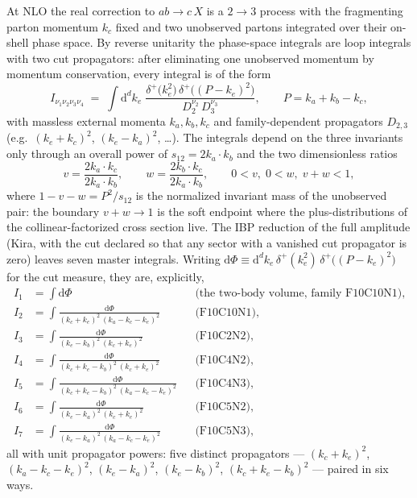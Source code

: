\documentclass[11pt]{article}
\newcommand{\dd}{\mathrm{d}}
\begin{document}
At NLO the real correction to $ab \to c\,X$ is a $2\to3$ process with
the fragmenting parton momentum $k_c$ fixed and two unobserved
partons integrated over their on-shell phase space.  By reverse
unitarity the phase-space integrals are loop integrals with two cut
propagators: after eliminating one unobserved momentum by momentum
conservation, every integral is of the form
\begin{equation}
  I_{\nu_1\nu_2\nu_3\nu_4}
  \;=\;
  \int \dd^d k_e\;
  \frac{\delta^{+}\!\big(k_e^2\big)\,
        \delta^{+}\!\big((P-k_e)^2\big)}
       {D_2^{\nu_2}\, D_3^{\nu_3}},
  \qquad P = k_a + k_b - k_c ,
  \label{eq:integral}
\end{equation}
with massless external momenta $k_a, k_b, k_c$ and family-dependent
propagators $D_{2,3}$ (e.g.\ $(k_e+k_c)^2$, $(k_e-k_a)^2$, \dots).
The integrals depend on the three invariants only through an overall
power of $s_{12} = 2k_a\!\cdot\!k_b$ and the two dimensionless ratios
\begin{equation}
  v = \frac{2k_a\!\cdot\!k_c}{2k_a\!\cdot\!k_b},
  \qquad
  w = \frac{2k_b\!\cdot\!k_c}{2k_a\!\cdot\!k_b},
  \qquad
  0 < v,\; 0 < w,\; v + w < 1 ,
\end{equation}
where $1 - v - w = P^2/s_{12}$ is the normalized invariant mass of
the unobserved pair: the boundary $v+w \to 1$ is the soft endpoint
where the plus-distributions of the collinear-factorized cross
section live.  The IBP reduction of the full amplitude (Kira, with
the cut declared so that any sector with a vanished cut propagator is
zero) leaves seven master integrals.  Writing
$\dd\Phi \equiv \dd^d k_e\,
\delta^{+}(k_e^2)\,\delta^{+}\!\big((P-k_e)^2\big)$ for the cut
measure, they are, explicitly,
\begin{equation}
\begin{aligned}
  I_1 &= \int \dd\Phi
    && \text{(the two-body volume, family F10C10N1)} , \\
  I_2 &= \int \frac{\dd\Phi}{(k_c+k_e)^2\,(k_a-k_c-k_e)^2}
    && \text{(F10C10N1)} , \\
  I_3 &= \int \frac{\dd\Phi}{(k_e-k_b)^2\,(k_c+k_e)^2}
    && \text{(F10C2N2)} , \\
  I_4 &= \int \frac{\dd\Phi}{(k_c+k_e-k_b)^2\,(k_c+k_e)^2}
    && \text{(F10C4N2)} , \\
  I_5 &= \int \frac{\dd\Phi}{(k_c+k_e-k_b)^2\,(k_a-k_c-k_e)^2}
    && \text{(F10C4N3)} , \\
  I_6 &= \int \frac{\dd\Phi}{(k_e-k_a)^2\,(k_c+k_e)^2}
    && \text{(F10C5N2)} , \\
  I_7 &= \int \frac{\dd\Phi}{(k_e-k_a)^2\,(k_a-k_c-k_e)^2}
    && \text{(F10C5N3)} ,
\end{aligned}
\label{eq:masters}
\end{equation}
all with unit propagator powers: five distinct propagators
--- $(k_c{+}k_e)^2$, $(k_a{-}k_c{-}k_e)^2$, $(k_e{-}k_a)^2$,
$(k_e{-}k_b)^2$, $(k_c{+}k_e{-}k_b)^2$ --- paired in six ways.
\end{document}
